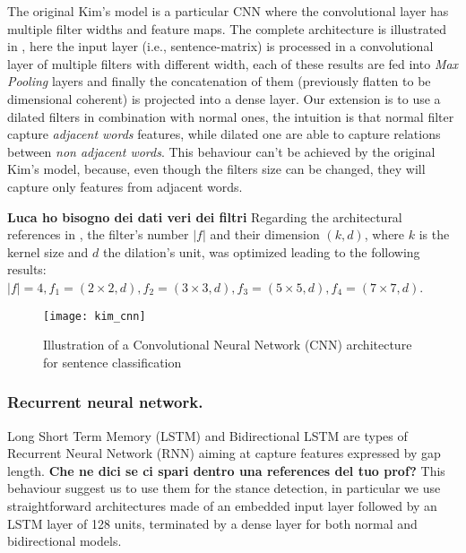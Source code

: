 The original Kim's model is a particular CNN where the convolutional layer has multiple filter widths and feature maps.
The complete architecture is illustrated in , here the input layer (i.e., sentence-matrix) is processed in a convolutional layer of multiple filters with different width, each of these results are fed into \emph{Max Pooling} layers and finally the concatenation of them (previously flatten to be dimensional coherent) is projected into a dense layer.
Our extension is to use a dilated filters in combination with normal ones, the intuition is that normal filter capture \emph{adjacent words} features, while dilated one are able to capture relations between \emph{non adjacent words}.
This behaviour can't be achieved by the original Kim's model, because, even though the filters size can be changed, they will capture only features from adjacent words.

\textbf{Luca ho bisogno dei dati veri dei filtri}
Regarding the architectural references in \cite{kim2014convolutional}, the filter's number $|f|$ and their dimension $(k,d)$, where $k$ is the kernel size and $d$ the dilation's unit, was optimized leading to the following results: $|f| = 4, f_1 = (2\times2,d), f_2 = (3\times3,d), f_3 = (5\times5,d), f_4 = (7\times7,d)$.

\begin{figure}[h]
\footnotesize
\centering
\texttt{[image: kim\_cnn]}
\caption{\cite{zhang2015sensitivity} Illustration of a Convolutional Neural Network (CNN) architecture for sentence classification}
\label{fig:kim}
\end{figure}

\subsubsection{Recurrent neural network.}
Long Short Term Memory (LSTM) and Bidirectional LSTM are types of Recurrent Neural Network (RNN) aiming at capture features expressed by gap length. \textbf{Che ne dici se ci spari dentro una references del tuo prof?}
This behaviour suggest us to use them for the stance detection, in particular we use straightforward architectures made of an embedded input layer followed by an LSTM layer of 128 units, terminated by a dense layer for both normal and bidirectional models.